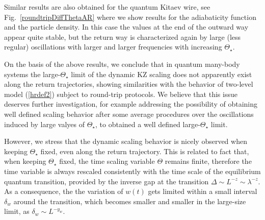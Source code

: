Similar results are also obtained for the quantum Kitaev wire, see
Fig.~\ref{roundtripDiffThetaAR} where we show results for the
adiabaticity function and the particle density.  In this case the
values at the end of the outward way appear quite stable, but the
return way is characterized again by large (less regular) oscillations
with larger and larger frequencies with increasing $\Theta_\star$.


On the basis of the above results, we conclude that in quantum
many-body systems the large-$\Theta_\star$ limit of the dynamic KZ
scaling does not apparently exist along the return trajectories,
showing similarities with the behavior of two-level model
(\ref{hrdef2}) subject to round-trip protocols. We believe that this
issue deserves further investigation, for example addressing the
possibility of obtaining well defined scaling behavior after some
average procedures over the oscillations induced by large valyes of
$\Theta_\star$, to obtained a well defined large-$\Theta_\star$ limit.

However, we stress that the dynamic scaling behavior is nicely
observed when keeping $\Theta_\star$ fixed, even along the return
trajectory. This is related to fact that, when keeping $\Theta_\star$
fixed, the time scaling variable $\Theta$ remains finite, therefore
the time variable is always rescaled consistently with the time scale
of the equilibrium quantum transition, provided by the inverse gap at
the transition $\Delta \sim L^{-z} \sim \lambda^{-z}$. As a
consequence, the the variation of $w(t)$ gets limited within a small
interval $\delta_w$ around the transition, which becomes smaller and
smaller in the large-size limit, as $\delta_w \sim L^{-y_w}$.
